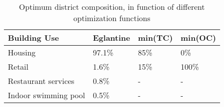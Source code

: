 \begin{table}[h!]
	\centering
	\caption{Optimum district composition, in function of different optimization functions}\vspace{2mm}
	\label{tab:CU_summary} 
	\begin{tabular}{llll} \toprule
		Building Use & Eglantine & min(TC) & min(OC) \\ \midrule
		Housing & 97.1\% & 85\% & 0\% \\
		Retail & 1.6\% & 15\% & 100\% \\
		Restaurant services & 0.8\% & - & - \\
		Indoor swimming pool & 0.5\% & - & - \\
		\bottomrule
	\end{tabular}	
\end{table}
